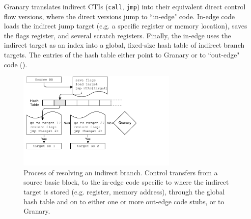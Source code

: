 \documentclass[preprint]{sigplanconf}
\begin{document}


Granary translates indirect CTIs (\texttt{call}, \texttt{jmp}) into their equivalent direct control flow versions, where the direct versions jump to ``in-edge" code. In-edge code loads the indirect jump target (e.g. a specific register or memory location), saves the flags register, and several scratch registers. Finally, the in-edge uses the indirect target as an index into a global, fixed-size hash table of indirect branch targets. The entries of the hash table either point to Granary or to ``out-edge" code (). 

\begin{figure}[t!]
\hspace{4em}\includegraphics[height=13em,clip=true,trim=0 5em 10em 0]{diagrams/ibl.pdf}
\caption{\label{fig:ibl}Process of resolving an indirect branch. Control transfers from a source basic block, to the in-edge code specific to where the indirect target is stored (e.g. register, memory address), through the global hash table and on to either one or more out-edge code stubs, or to Granary.}
\end{figure}
\end{document}
